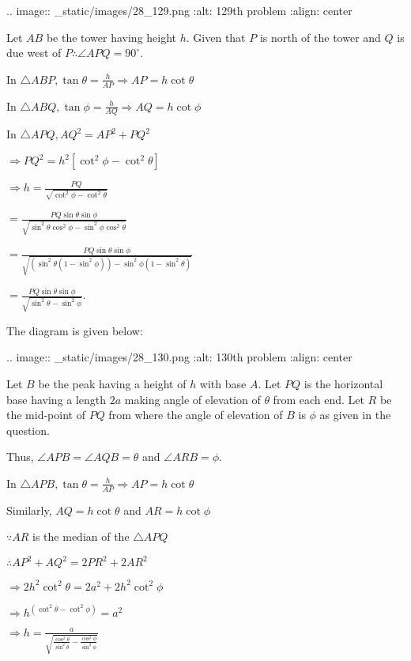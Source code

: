   .. image:: _static/images/28_129.png
  :alt: 129th problem
  :align: center

  Let $AB$ be the tower having height $h$. Given that $P$ is north of the tower and
  $Q$ is due west of $P\therefore \angle APQ= 90^\circ$.

  In $\triangle ABP, \tan\theta = \frac{h}{AP} \Rightarrow AP = h\cot\theta$

  In $\triangle ABQ, \tan\phi = \frac{h}{AQ} \Rightarrow AQ = h\cot\phi$

  In $\triangle APQ, AQ^2 = AP^2 + PQ^2$

  $\Rightarrow PQ^2 = h^2[\cot^2\phi - \cot^2\theta]$

  $\Rightarrow h = \frac{PQ}{\sqrt{\cot^2\phi - \cot^2\theta}}$

  $= \frac{PQ\sin\theta\sin\phi}{\sqrt{\sin^2\theta\cos^2\phi - \sin^2\phi\cos^2\theta}}$

  $= \frac{PQ\sin\theta\sin\phi}{\sqrt{(\sin^2\theta(1 - \sin^2\phi)) - \sin^2\phi(1 -
      \sin^2\theta)}}$


  $= \frac{PQ\sin\theta\sin\phi}{\sqrt{\sin^2\theta - \sin^2\phi}}$.

\item The diagram is given below:

  .. image:: _static/images/28_130.png
  :alt: 130th problem
  :align: center

  Let $B$ be the peak having a height of $h$ with base $A$. Let $PQ$ is the
  horizontal base having a length $2a$ making angle of elevation of $\theta$ from each
  end. Let $R$ be the mid-point of $PQ$ from where the angle of elevation of $B$ is
  $\phi$ as given in the question.

  Thus, $\angle APB = \angle AQB = \theta$ and $\angle ARB = \phi$.

  In $\triangle APB, \tan\theta = \frac{h}{AP} \Rightarrow AP = h\cot\theta$

  Similarly, $AQ = h\cot\theta$ and $AR = h\cot\phi$

  $\because AR$ is the median of the $\triangle APQ$

  $\therefore AP^2 + AQ^2 = 2PR^2 + 2AR^2$

  $\Rightarrow 2h^2\cot^2\theta = 2a^2 + 2h^2\cot^2\phi$

  $\Rightarrow h^(\cot^2\theta - \cot^2\phi) = a^2$

  $\Rightarrow h = \frac{a}{\sqrt{\frac{\cos^2\theta}{\sin^2\theta} -
      \frac{\cos^2\phi}{\sin^2\phi}}}$

